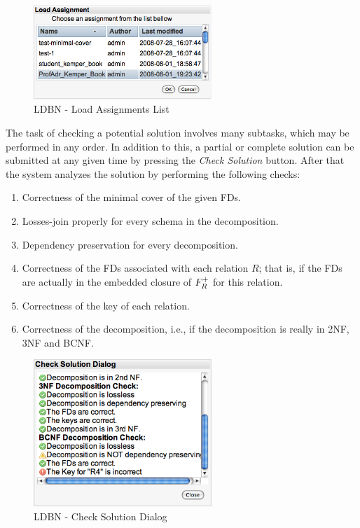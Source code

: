 \begin{figure}[h]
	\begin{center}
		\includegraphics[width=0.6\textwidth]{./img/screen02.png}
		\caption{LDBN - Load Assignments List}
		\label{fig:screen02}
	\end{center}
\end{figure}

The task of checking a potential solution
involves many subtasks, which may be performed in any order. In addition to this,  a partial or complete 
solution can be submitted at any given time by pressing the \textit{Check Solution} button. 
After that the system analyzes the solution by performing the following checks:
\begin{enumerate}
	\item Correctness of the minimal cover of the given FDs. 
	\item Losses-join properly for every schema in the decomposition.
	\item Dependency preservation for every decomposition.
	\item Correctness of the FDs associated with each relation $R$; that is, 
	if the FDs are actually in the embedded closure of $F_{R}\sp{+}$ for this relation.
	\item Correctness of the key of each relation.
	\item Correctness of the decomposition, i.e., if the decomposition is really in 2NF, 3NF and BCNF.
\end{enumerate}

\begin{figure}[h]
	\begin{center}
		\includegraphics[width=0.6\textwidth]{./img/screen03.png}
		\caption{LDBN - Check Solution Dialog}
		\label{fig:screen03}
	\end{center}
\end{figure}

